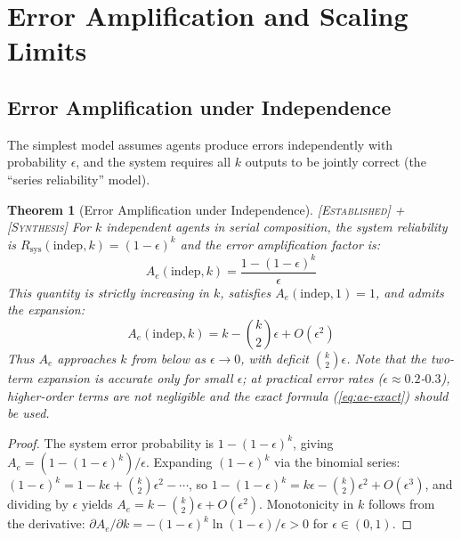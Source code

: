 \documentclass[11pt]{article}
\newtheorem{theorem}{Theorem}[section]
\theoremstyle{definition}
\theoremstyle{remark}
\newcommand{\established}{\textsc{[Established]}}
\newcommand{\synthesis}{\textsc{[Synthesis]}}
\begin{document}
\section{Error Amplification and Scaling Limits}
\label{sec:error}

\subsection{Error Amplification under Independence}

The simplest model assumes agents produce errors independently with probability $\epsilon$, and the system requires all $k$ outputs to be jointly correct (the ``series reliability'' model).

\begin{theorem}[Error Amplification under Independence] \established{} + \synthesis{}
\label{thm:error-amp}
For $k$ independent agents in serial composition, the system reliability is $R_{\mathrm{sys}}(\mathrm{indep}, k) = (1 - \epsilon)^k$ and the error amplification factor is:
\begin{equation}
\label{eq:ae-exact}
  A_e(\mathrm{indep}, k) = \frac{1 - (1-\epsilon)^k}{\epsilon}
\end{equation}
This quantity is strictly increasing in $k$, satisfies $A_e(\mathrm{indep}, 1) = 1$, and admits the expansion:
\begin{equation}
\label{eq:ae-expansion}
  A_e(\mathrm{indep}, k) = k - \binom{k}{2}\epsilon + O(\epsilon^2)
\end{equation}
Thus $A_e$ approaches $k$ from below as $\epsilon \to 0$, with deficit $\binom{k}{2}\epsilon$.
Note that the two-term expansion is accurate only for small $\epsilon$; at practical error rates ($\epsilon \approx 0.2$-$0.3$), higher-order terms are not negligible and the exact formula (\ref{eq:ae-exact}) should be used.
\end{theorem}

\begin{proof}
The system error probability is $1 - (1-\epsilon)^k$, giving $A_e = (1 - (1-\epsilon)^k)/\epsilon$.
Expanding $(1-\epsilon)^k$ via the binomial series:
$(1-\epsilon)^k = 1 - k\epsilon + \binom{k}{2}\epsilon^2 - \cdots$,
so $1 - (1-\epsilon)^k = k\epsilon - \binom{k}{2}\epsilon^2 + O(\epsilon^3)$,
and dividing by $\epsilon$ yields $A_e = k - \binom{k}{2}\epsilon + O(\epsilon^2)$.
Monotonicity in $k$ follows from the derivative: $\partial A_e / \partial k = -(1-\epsilon)^k \ln(1-\epsilon)/\epsilon > 0$ for $\epsilon \in (0,1)$.
\end{proof}
\end{document}
